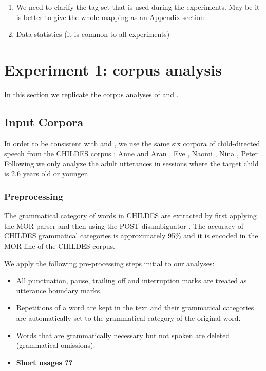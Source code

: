 \begin{enumerate}
\item We need to clarify the tag set that is used during the
  experiments. May be it is better to give the whole mapping as an
  Appendix section.
\item Data statistics (it is common to all experiments)
\end{enumerate}
\section{Experiment 1: corpus analysis}
In this section we replicate the corpus analyses of \cite{20674613}
and \cite{Mintz200391}.  

\subsection{Input Corpora}

In order to be consistent with \cite{20674613} and \cite{Mintz200391},
we use the same six corpora of child-directed speech from the CHILDES
corpus \citep*{macwhinney2000childes}: Anne and Aran
\citep*{theakston2001role}, Eve \citep*{JCL:1765112}, Naomi
\citep*{sachs1983talking}, Nina \citep*{suppes1974semantics}, Peter
\citep*{Bloom1974380, bloom1975structure}.  Following
\cite{Mintz200391} we only analyze the adult utterances in sessions
where the target child is 2.6 years old or younger.

\subsubsection{Preprocessing}

The grammatical category of words in CHILDES are extracted by first
applying the MOR parser \citep*{macwhinney2000childes} and then using
the POST disambiguator \citep*{sagae2004automatic}.  The accuracy of
CHILDES grammatical categories is approximately 95\%
\citep*{parisse2000automatic} and it is encoded in the MOR line of the
CHILDES corpus.

We apply the following pre-processing steps \citep*{20674613} initial
to our analyses:
\begin{itemize}
\item All punctuation, pause, trailing off and interruption marks are
  treated as utterance boundary marks.
\item Repetitions of a word are kept in the text and their grammatical
  categories are automatically set to the grammatical category of the
  original word.
\item Words that are grammatically necessary but not spoken are
  deleted (grammatical omissions).
\item {\bf Short usages ??}
\end{itemize}

